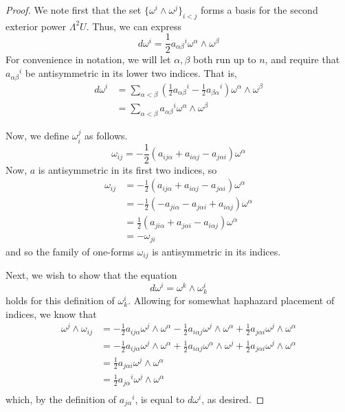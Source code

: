 \documentclass[fontsize=11pt]{scrartcl} %
\numberwithin{equation}{section} %
\numberwithin{figure}{section} %
\numberwithin{table}{section} %
\begin{document}
\begin{proof}
    We note first that the set $\{\omega^i\wedge\omega^j\}_{i<j}$ forms a basis
    for the second exterior power $\Lambda^2U$. Thus, we can express
    \[
        d\omega^i = \frac{1}{2}a_{\alpha\beta}{}^i\omega^{\alpha}\wedge\omega^{\beta}
    \]
    For convenience in notation, we will let $\alpha,\beta$ both run up to $n$,
    and require that $a_{\alpha\beta}{}^i$ be antisymmetric in its lower two
    indices. That is,
    \[
        \begin{aligned}
            d\omega^i &= \sum_{\alpha<\beta}
            (\frac{1}{2}a_{\alpha\beta}{}^i -
            \frac{1}{2}a_{\beta\alpha}{}^i)\omega^{\alpha}\wedge\omega^{\beta}\\
        &= \sum_{\alpha<\beta}
        a_{\alpha\beta}{}^i\omega^{\alpha}\wedge\omega^{\beta}
    \end{aligned}
    \]

    Now, we define $\omega^j_i$ as follows.
    \[
        \omega_{ij} = -\frac{1}{2}(a_{ij\alpha} + a_{i\alpha j} - a_{j\alpha
        i})\omega^{\alpha}
    \]
    Now, $a$ is antisymmetric in its first two indices, so
    \[
        \begin{aligned}
        \omega_{ij} &= -\frac{1}{2}(a_{ij\alpha} + a_{i\alpha j} - a_{j\alpha
        i})\omega^{\alpha}\\
        &= -\frac{1}{2}(-a_{ji\alpha} - a_{j\alpha i} + a_{i\alpha
        j})\omega^{\alpha}\\
        &= \frac{1}{2}(a_{ji\alpha} + a_{j\alpha i} -a_{i\alpha
        j})\omega^{\alpha}\\
        &= -\omega_{ji}
    \end{aligned}
    \]
    and so the family of one-forms $\omega_{ij}$ is antisymmetric in its
    indices.

    Next, we wish to show that the equation
    \[
        d\omega^i = \omega^k\wedge\omega_k^i
    \]
    holds for this definition of $\omega_k^i$. Allowing for somewhat haphazard
    placement of indices, we know that
    \[
        \begin{aligned}
            \omega^j\wedge\omega_{ij} &=
            -\frac{1}{2}a_{ij\alpha}\omega^j\wedge\omega^{\alpha} -
            \frac{1}{2}a_{i\alpha j}\omega^j\wedge\omega^{\alpha} +
            \frac{1}{2}a_{j\alpha i}\omega^j\wedge\omega^{\alpha}\\
            &= 
            -\frac{1}{2}a_{ij\alpha}\omega^j\wedge\omega^{\alpha} +
            \frac{1}{2}a_{i\alpha j}\omega^{\alpha}\wedge\omega^j +
            \frac{1}{2}a_{j\alpha i}\omega^j\wedge\omega^{\alpha}\\
            &=
            \frac{1}{2}a_{j\alpha i}\omega^j\wedge\omega^{\alpha}\\
            &=
            \frac{1}{2}a_{j\alpha}{}^i\omega^j\wedge\omega^{\alpha}\\
        \end{aligned}
    \]
    which, by the definition of $a_{j\alpha}{}^i$, is equal to $d\omega^i$, as
    desired.


\end{proof}
\end{document}
